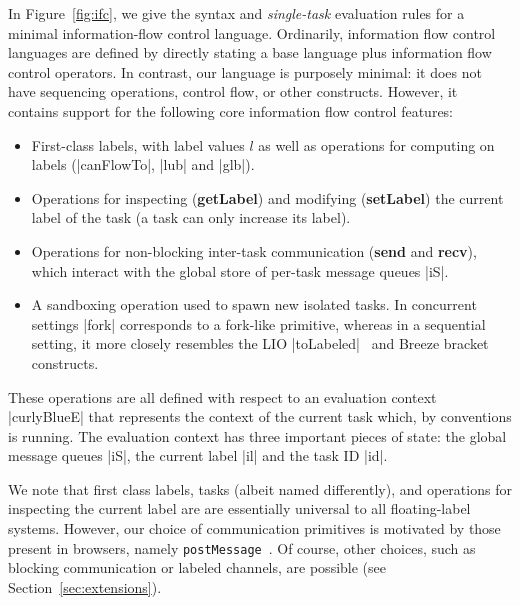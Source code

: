 In Figure~\ref{fig:ifc}, we give the syntax and \emph{single-task}
evaluation rules for a minimal information-flow control language.  
Ordinarily, information flow control languages are defined by directly
stating a base language plus information flow control operators.  In
contrast, our language is purposely minimal: it does not have sequencing
operations, control flow, or other constructs.  However, it contains
support for the following core information flow control features:

\begin{itemize}
    \item First-class labels, with label values $l$ as well as operations for computing on
labels (|canFlowTo|, |lub| and |glb|).
    \item Operations for inspecting (\textbf{getLabel}) and modifying
    (\textbf{setLabel}) the current label of the task (a task can only increase its label).
    \item Operations for non-blocking inter-task communication (\textbf{send}
    and \textbf{recv}), which interact with the global store of per-task
    message queues |iS|.
    \item A sandboxing operation used to spawn new isolated tasks. In
    concurrent settings |fork| corresponds to a fork-like primitive,
    whereas in a
    sequential setting, it more closely resembles the LIO
    |toLabeled|~\cite{lio} and Breeze
    bracket~\cite{Hritcu:2013:YIB:2497621.2498098} constructs.
\end{itemize}

These operations are all defined with respect to an evaluation context
|curlyBlueE| that represents the context of the current task which, by
conventions is running. The evaluation context has three important pieces of
state: the global message queues |iS|, the current label |il| and the task ID |id|.
 
We note that first class labels, tasks (albeit named differently), and
operations for inspecting the current label are are essentially universal to
all floating-label systems.
%
However, our choice of communication primitives is motivated by
those present in browsers, namely \texttt{postMessage}~\cite{webmessaging}.
%
Of course, other choices, such as blocking communication or labeled channels,
are possible (see Section~\ref{sec:extensions}).
%


